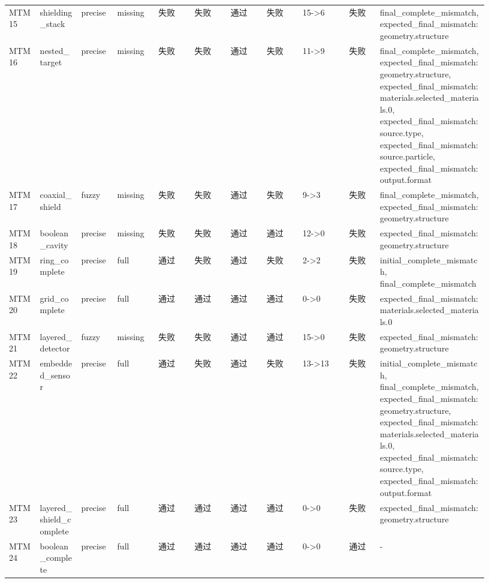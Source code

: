 \documentclass[11pt]{ctexart}
\begin{document}
\begin{longtable}{p{0.06\linewidth}p{0.08\linewidth}p{0.07\linewidth}p{0.08\linewidth}p{0.07\linewidth}p{0.07\linewidth}p{0.07\linewidth}p{0.07\linewidth}p{0.09\linewidth}p{0.06\linewidth}p{0.21\linewidth}}
MTM15 & shielding\_stack & precise & missing & 失败 & 失败 & 通过 & 失败 & 15->6 & 失败 & final\_complete\_mismatch, expected\_final\_mismatch:geometry.structure \\
MTM16 & nested\_target & precise & missing & 失败 & 失败 & 通过 & 失败 & 11->9 & 失败 & final\_complete\_mismatch, expected\_final\_mismatch:geometry.structure, expected\_final\_mismatch:materials.selected\_materials.0, expected\_final\_mismatch:source.type, expected\_final\_mismatch:source.particle, expected\_final\_mismatch:output.format \\
MTM17 & coaxial\_shield & fuzzy & missing & 失败 & 失败 & 通过 & 失败 & 9->3 & 失败 & final\_complete\_mismatch, expected\_final\_mismatch:geometry.structure \\
MTM18 & boolean\_cavity & precise & missing & 失败 & 失败 & 通过 & 通过 & 12->0 & 失败 & expected\_final\_mismatch:geometry.structure \\
MTM19 & ring\_complete & precise & full & 通过 & 失败 & 通过 & 失败 & 2->2 & 失败 & initial\_complete\_mismatch, final\_complete\_mismatch \\
MTM20 & grid\_complete & precise & full & 通过 & 通过 & 通过 & 通过 & 0->0 & 失败 & expected\_final\_mismatch:materials.selected\_materials.0 \\
MTM21 & layered\_detector & fuzzy & missing & 失败 & 失败 & 通过 & 通过 & 15->0 & 失败 & expected\_final\_mismatch:geometry.structure \\
MTM22 & embedded\_sensor & precise & full & 通过 & 失败 & 通过 & 失败 & 13->13 & 失败 & initial\_complete\_mismatch, final\_complete\_mismatch, expected\_final\_mismatch:geometry.structure, expected\_final\_mismatch:materials.selected\_materials.0, expected\_final\_mismatch:source.type, expected\_final\_mismatch:output.format \\
MTM23 & layered\_shield\_complete & precise & full & 通过 & 通过 & 通过 & 通过 & 0->0 & 失败 & expected\_final\_mismatch:geometry.structure \\
MTM24 & boolean\_complete & precise & full & 通过 & 通过 & 通过 & 通过 & 0->0 & 通过 & - \\
\bottomrule
\end{longtable}
\end{document}
